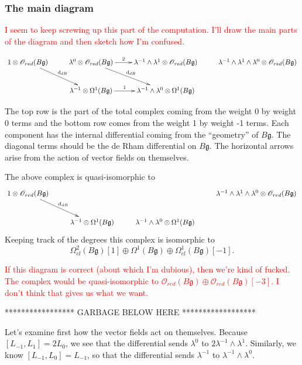 \documentclass{amsart}
\def\d{{\rm d}}
\def\fg{\mathfrak g}
\def\sO{\mathscr O}
\def\owen{\textcolor{red}}
\begin{document}
\subsubsection{The main diagram} 

\owen{I seem to keep screwing up this part of the computation. I'll draw the main parts of the diagram and then sketch how I'm confused.}

\[
\xymatrix{
1 \otimes \sO_{red}(B\fg) \ar[rd]^{\d_{dR}} & \lambda^0 \otimes \sO_{red}(B\fg) \ar[r]^-2 \ar[rd]^{\d_{dR}} & \lambda^{-1} \wedge \lambda^1 \otimes \sO_{red}(B\fg) & \lambda^{-1} \wedge \lambda^1 \wedge \lambda^0 \otimes \sO_{red}(B\fg) \\
 & \lambda^{-1} \otimes \Omega^1(B\fg) \ar[r]^-1 & \lambda^{-1} \wedge \lambda^0 \otimes\Omega^1(B\fg) &
}
\]

The top row is the part of the total complex coming from the weight 0
by weight 0 terms and the bottom row comes from the weight 1 by weight
-1 terms. Each component has the internal differential coming from the
``geometry'' of $B\fg$. The diagonal terms should be the de Rham
differential on $B\fg$. The horizontal arrows arise from the action of
vector fields on themselves.

The above complex is quasi-isomorphic to
\[
\xymatrix{
1 \otimes \sO_{red}(B\fg) \ar[rd]^{\d_{dR}} & & & \lambda^{-1} \wedge \lambda^1 \wedge \lambda^0 \otimes \sO_{red}(B\fg) \\
 & \lambda^{-1} \otimes \Omega^1(B\fg) & \lambda^{-1} \wedge \lambda^0 \otimes\Omega^1(B\fg) &
}
\]
Keeping track of the degrees this complex is isomorphic to
\[
\Omega^2_{cl}(B \fg)[1] \oplus \Omega^1(B \fg) \oplus \Omega^1_{cl}(B
\fg)[-1] .
\]

\owen{If this diagram is correct (about which I'm dubious), then we're kind of fucked. The complex would be quasi-isomorphic to $\sO_{red}(B\fg) \oplus \sO_{red}(B\fg)[-3]$. I don't think that gives us what we want.}

***************** GARBAGE BELOW HERE ******************

Let's examine first how the vector fields act on themselves. Because $[L_{-1},L_1] = 2 L_0$, we see that the differential sends $\lambda^0$ to $2 \lambda^{-1} \wedge \lambda^1$.  Similarly, we know $[L_{-1},L_0] = L_{-1}$, so that the differential sends $\lambda^{-1}$ to $\lambda^{-1} \wedge \lambda^0$.
\end{document}
